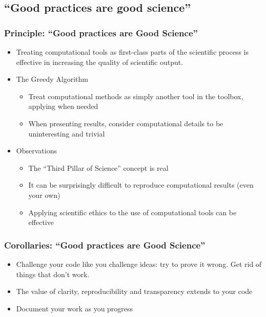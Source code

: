 \documentclass{beamer}
\begin{document}
\subsection{``Good practices are good science''}
\begin{frame}[fragile]
\frametitle{Principle: ``Good practices are Good Science''}
\begin{itemize}
  \item Treating computational tools as first-class parts of the scientific process is effective in increasing the quality of scientific output.
\item The Greedy Algorithm
\begin{itemize}
\item Treat computational methods as simply another tool in the toolbox, applying when needed
\item When presenting results, consider computational details to be uninteresting and trivial
\end{itemize}
\item Observations
\begin{itemize}
\item The ``Third Pillar of Science'' concept is real
\item It can be surprisingly difficult to reproduce computational results (even your own)
\item Applying scientific ethics to the use of computational tools can be effective
\end{itemize}
\end{itemize}
\end{frame}

\begin{frame}[fragile]
\frametitle{Corollaries: ``Good practices are Good Science''}
\begin{itemize}
\item Challenge your code like you challenge ideas: try to prove it wrong. Get rid of things that don't work.
\item The value of clarity, reproducibility and transparency extends to your code
\item Document your work as you progress
\end{itemize}
\end{frame}
\end{document}
